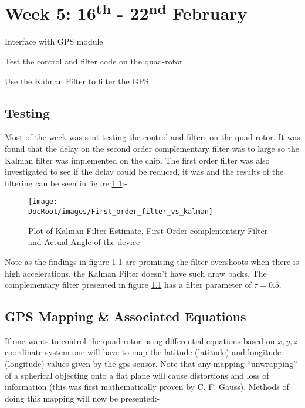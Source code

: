 \chapter{Week 5: 16\textsuperscript{th} - 22\textsuperscript{nd} February }

\begin{itemize*}
	\item Interface with GPS module 
	\item  Test the control and filter code on the quad-rotor
	\item Use the Kalman Filter to filter the GPS
\end{itemize*}

 \tocless\section{Testing }
Most of the week was sent testing the control and filters on the quad-rotor. It was found that the delay on the second order complementary filter was to large so the Kalman filter was implemented on the chip. The first order filter was also investigated to see if the delay could be reduced, it was and the results of the filtering can be seen in figure \ref{Fig: Kalman Filter Estimate and First Order complementary Filter}:-



						\begin{figure}[h]
							\centering
							\texttt{[image: \\DocRoot/images/First\_order\_filter\_vs\_kalman]}
							\caption{Plot of Kalman Filter Estimate, First Order complementary Filter and Actual Angle of the device}
							\label{Fig: Kalman Filter Estimate and First Order complementary Filter}
						\end{figure}
						
Note as the findings in figure \ref{Fig: Kalman Filter Estimate and First Order complementary Filter} are promising the filter overshoots when there is high accelerations, the Kalman Filter doesn't have such draw backs. The complementary filter presented in figure \ref{Fig: Kalman Filter Estimate and First Order complementary Filter} has a filter parameter of $\tau = 0.5$.						


 \tocless\section{GPS Mapping \& Associated Equations}	

If one wants to control the quad-rotor using differential equations based on $x,y,z$ coordinate system one will have to map the latitude (\gls{latitude}) and longitude (\gls{longitude}) values given by the \gls{gps} sensor.	Note that any mapping \enquote{unwrapping} of a spherical objecting onto a flat plane will cause distortions and loss of information (this was first mathematically proven by C. F. Gauss). Methods of doing this mapping will now be presented:-

